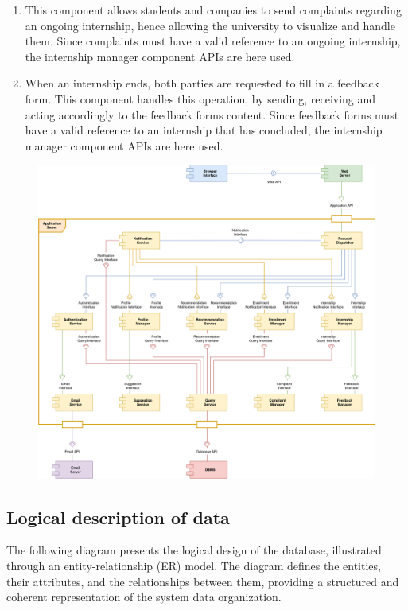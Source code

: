 \begin{enumerate}[label=\textbf{C\arabic* -}]
\item {}
This component allows students and companies to send complaints regarding an ongoing internship, hence allowing the university to visualize and handle them.
Since complaints must have a valid reference to an ongoing internship, the internship manager component APIs are here used.

\item {}
When an internship ends, both parties are requested to fill in a feedback form.
This component handles this operation, by sending, receiving and acting accordingly to the feedback forms content.
Since feedback forms must have a valid reference to an internship that has concluded, the internship manager component APIs are here used.

\end{enumerate}

\begin{figure}[H]
    \centering
    \includegraphics[width=0.8\linewidth]{../assets/components-diagrams/components-diagram.png}
\end{figure}

\subsection{Logical description of data}

The following diagram presents the logical design of the database, illustrated through an entity-relationship (ER) model.
The diagram defines the entities, their attributes, and the relationships between them, providing a structured and coherent representation of the system data organization.

